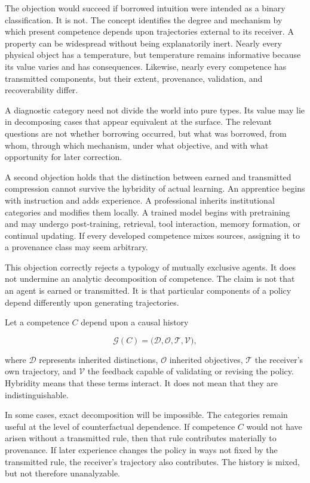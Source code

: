 \documentclass[11pt]{article}
\begin{document}
The objection would succeed if borrowed intuition were intended as a binary classification. It is not. The concept identifies the degree and mechanism by which present competence depends upon trajectories external to its receiver. A property can be widespread without being explanatorily inert. Nearly every physical object has a temperature, but temperature remains informative because its value varies and has consequences. Likewise, nearly every competence has transmitted components, but their extent, provenance, validation, and recoverability differ.

A diagnostic category need not divide the world into pure types. Its value may lie in decomposing cases that appear equivalent at the surface. The relevant questions are not whether borrowing occurred, but what was borrowed, from whom, through which mechanism, under what objective, and with what opportunity for later correction.

A second objection holds that the distinction between earned and transmitted compression cannot survive the hybridity of actual learning. An apprentice begins with instruction and adds experience. A professional inherits institutional categories and modifies them locally. A trained model begins with pretraining and may undergo post-training, retrieval, tool interaction, memory formation, or continual updating. If every developed competence mixes sources, assigning it to a provenance class may seem arbitrary.

This objection correctly rejects a typology of mutually exclusive agents. It does not undermine an analytic decomposition of competence. The claim is not that an agent is earned or transmitted. It is that particular components of a policy depend differently upon generating trajectories.

Let a competence $C$ depend upon a causal history

\[
\mathcal{G}(C)
=
\bigl(
\mathcal{D},
\mathcal{O},
\mathcal{T},
\mathcal{V}
\bigr),
\]

where $\mathcal{D}$ represents inherited distinctions, $\mathcal{O}$ inherited objectives, $\mathcal{T}$ the receiver's own trajectory, and $\mathcal{V}$ the feedback capable of validating or revising the policy. Hybridity means that these terms interact. It does not mean that they are indistinguishable.

In some cases, exact decomposition will be impossible. The categories remain useful at the level of counterfactual dependence. If competence $C$ would not have arisen without a transmitted rule, then that rule contributes materially to provenance. If later experience changes the policy in ways not fixed by the transmitted rule, the receiver's trajectory also contributes. The history is mixed, but not therefore unanalyzable.
\end{document}
